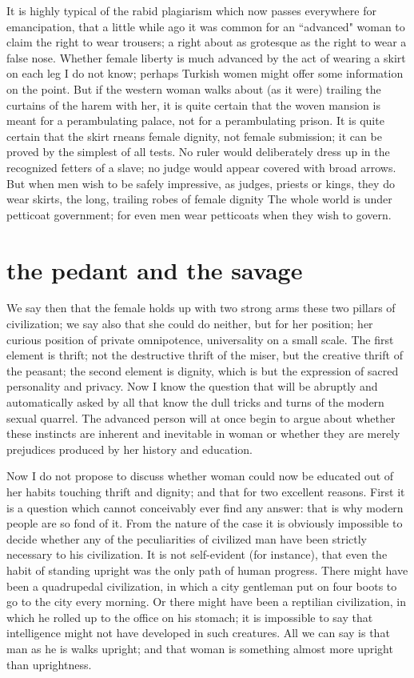 \documentclass[final,10pt,letterpaper,twocolumn,openany]{book}
\begin{document}
It is highly typical of the
rabid plagiarism which now passes everywhere for emancipation, that a
little while ago it was common for an ``advanced" woman to claim the
right to wear trousers; a right about as grotesque as the right to wear a
false nose. Whether female liberty is much advanced by the act of wearing
a skirt on each leg I do not know; perhaps Turkish women might offer
some information on the point. But if the western woman walks about (as
it were) trailing the curtains of the harem with her, it is quite certain that
the woven mansion is meant for a perambulating palace, not for a
perambulating prison. It is quite certain that the skirt rneans female dignity,
not female submission; it can be proved by the simplest of all tests. No
ruler would deliberately dress up in the recognized fetters of a slave; no
judge would appear covered with broad arrows. But when men wish to be
safely impressive, as judges, priests or kings, they do wear skirts, the long,
trailing robes of female dignity The whole world is under petticoat
government; for even men wear petticoats when they wish to govern.

\section{the pedant and the savage}

    We say then that the female holds up with two strong arms these two
pillars of civilization; we say also that she could do neither, but for her
position; her curious position of private omnipotence, universality on a
small scale. The first element is thrift; not the destructive thrift of the
miser, but the creative thrift of the peasant; the second element is dignity,
which is but the expression of sacred personality and privacy. Now I know
the question that will be abruptly and automatically asked by all that know
the dull tricks and turns of the modern sexual quarrel. The advanced
person will at once begin to argue about whether these instincts are
inherent and inevitable in woman or whether they are merely prejudices
produced by her history and education. 

Now I do not propose to discuss
whether woman could now be educated out of her habits touching thrift
and dignity; and that for two excellent reasons. First it is a question which
cannot conceivably ever find any answer: that is why modern people are
so fond of it. From the nature of the case it is obviously impossible to
decide whether any of the peculiarities of civilized man have been strictly
necessary to his civilization. It is not self-evident (for instance), that even
the habit of standing upright was the only path of human progress. There
might have been a quadrupedal civilization, in which a city gentleman put
on four boots to go to the city every morning. Or there might have been a
reptilian civilization, in which he rolled up to the office on his stomach; it
is impossible to say that intelligence might not have developed in such
creatures. All we can say is that man as he is walks upright; and that
woman is something almost more upright than uprightness.
\end{document}
